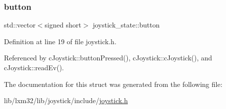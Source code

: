 \mbox{\label{structjoystick__state_af16d0e2bea842ab4fafa05ce23f45f56}} 
\subsubsection{\texorpdfstring{button}{button}}
{\footnotesize\ttfamily std\+::vector$<$signed short$>$ joystick\+\_\+state\+::button}



Definition at line 19 of file joystick.\+h.



Referenced by c\+Joystick\+::button\+Pressed(), c\+Joystick\+::c\+Joystick(), and c\+Joystick\+::read\+Ev().



The documentation for this struct was generated from the following file\+:\begin{DoxyCompactItemize}
\item 
lib/lxm32/lib/joystick/include/\hyperlink{joystick_8h}{joystick.\+h}\end{DoxyCompactItemize}
